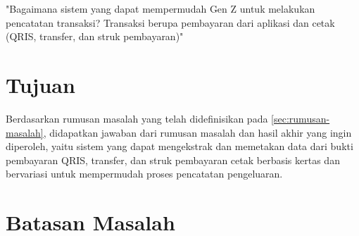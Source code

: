 \begin{center}
	"Bagaimana sistem yang dapat mempermudah Gen Z untuk melakukan pencatatan transaksi? Transaksi berupa pembayaran dari aplikasi dan cetak (QRIS, transfer, dan struk pembayaran)"
\end{center}

\section{Tujuan}
\label{sec:tujuan}

Berdasarkan rumusan masalah yang telah didefinisikan pada \autoref{sec:rumusan-masalah}, didapatkan jawaban dari rumusan masalah dan hasil akhir yang ingin diperoleh, yaitu sistem yang dapat mengekstrak dan memetakan data dari bukti pembayaran QRIS, transfer, dan struk pembayaran cetak berbasis kertas dan bervariasi untuk mempermudah proses pencatatan pengeluaran.

\section{Batasan Masalah}
\label{sec:batasan-masalah}

